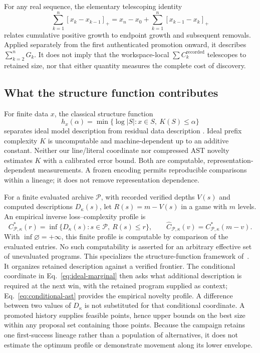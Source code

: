 \documentclass[11pt]{article}
\theoremstyle{definition}
\theoremstyle{remark}
\newcommand{\Pos}[1]{[#1]_{+}}
\begin{document}
For any real sequence, the elementary telescoping identity
\begin{equation}
 \sum_{k=1}^{n}\Pos{x_k-x_{k-1}}
 =x_n-x_0+\sum_{k=1}^{n}\Pos{x_{k-1}-x_k}
 \label{eq:positive-variation}
\end{equation}
relates cumulative positive growth to endpoint growth and subsequent removals.
Applied separately from the first authenticated promotion onward, it describes
$\sum_{k=2}^{n}G_k$.
It does not imply that the workspace-local $\sum C_k^{\mathrm{recorded}}$ telescopes
to retained size, nor that either quantity measures the complete cost of discovery.

\subsection{What the structure function contributes}
For finite data $x$, the classical structure function
\begin{equation}
 h_x(\alpha)=\min\{\log |S|:x\in S,\ K(S)\le\alpha\}
 \label{eq:classical-structure-function}
\end{equation}
separates ideal model description from residual data description
\cite{kolmogorov1965,solomonoff1964,vereshchagin2004,live2008}.
Ideal prefix complexity $K$ is uncomputable and machine-dependent up to an additive
constant. Neither our line/literal coordinate nor compressed AST novelty estimates
$K$ with a calibrated error bound. Both are computable, representation-dependent
measurements. A frozen encoding permits reproducible comparisons within a lineage;
it does not remove representation dependence.

For a finite evaluated archive $\mathcal P$, with recorded verified depths $V(s)$
and computed descriptions $D_\kappa(s)$, let $R(s)=m-V(s)$ in a game with $m$ levels.
An empirical inverse loss--complexity profile is
\begin{equation}
 C^*_{\mathcal P,\kappa}(r)
 =\inf\{D_\kappa(s):s\in\mathcal P,\ R(s)\le r\},\qquad
 \widehat C_{\mathcal P,\kappa}(v)=C^*_{\mathcal P,\kappa}(m-v).
 \label{eq:structure-function}
\end{equation}
With $\inf\varnothing=+\infty$, this finite profile is computable by comparison of
the evaluated entries. No such computability is asserted for an arbitrary effective
set of unevaluated programs. This specializes the structure-function framework
of~\cite{losscomplexity}.
It organizes retained description against a verified frontier. The conditional
coordinate in Eq.~\eqref{eq:ideal-marginal} then asks what additional description
is required at the next win, with the retained program supplied as context;
Eq.~\eqref{eq:conditional-ast} provides the empirical novelty profile. A difference
between two values of $D_\kappa$ is not substituted for that conditional coordinate.
A promoted history supplies feasible points, hence upper bounds on the best size
within any proposal set containing those points. Because the campaign retains one
first-success lineage rather than a population of alternatives, it does not estimate
the optimum profile or demonstrate movement along its lower envelope.
\end{document}
